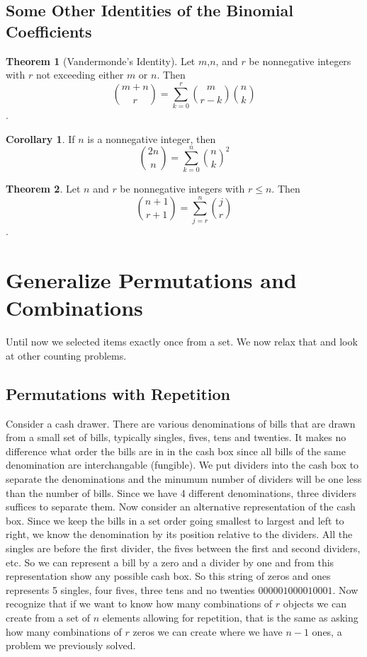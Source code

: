 \documentclass[11pt]{book} %
\theoremstyle {definition}
\newtheorem {theorem}{Theorem}[section]
\newtheorem {corollary}{Corollary}[section]
\theoremstyle {remark}
\begin{document}
    \subsection {Some Other Identities of the Binomial Coefficients}
\begin{theorem}[Vandermonde's Identity]
Let $m$,$n$, and $r$ be nonnegative integers with $r$ not exceeding either $m$ or $n$. Then 
$$ {{m+n} \choose r} = \sum_{k=0}^r {m\choose{r-k}} {n\choose k}$$.
\end{theorem}

\begin{corollary}
If $n$ is a nonnegative integer, then
$${ {2n}\choose n} = \sum_{k=0}^{n}  {n\choose k}^2$$
\end{corollary}

\begin{theorem}
Let $n$ and $r$ be nonnegative integers with $r \le n$. Then
$${ {n+1} \choose {r+1}} = \sum_{j=r}^n {j\choose r}$$.
\end{theorem}


\section {Generalize Permutations and Combinations}
Until now we selected items exactly once from a set. We now relax that and look at other counting problems.
    \subsection {Permutations with Repetition}
Consider a cash drawer. There are various denominations of bills that are drawn from a small set of bills, typically singles, fives, tens and twenties. It makes no difference what order the bills are in in the cash box since all bills of the same denomination are interchangable (fungible). We put dividers into the cash box to separate the denominations and the minumum number of dividers will be one less than the number of bills. Since we have 4 different denominations, three dividers suffices to separate them. Now consider an alternative representation of the cash box. Since we keep the bills in a set order going smallest to largest and left to right, we know the denomination by its position relative to the dividers. All the singles are before the first divider, the fives between the first and second dividers, etc. So we can represent a bill by a zero and a divider by one and from this representation show any possible cash box.  So this string of zeros and ones represents 5 singles, four fives, three tens and no twenties $000001000010001$. Now recognize that if we want to know how many combinations of $r$ objects we can create from a set of $n$ elements allowing for repetition, that is the same as asking how many combinations of $r$ zeros we can create where we have $n-1$ ones, a problem we previously solved.
\end{document}
